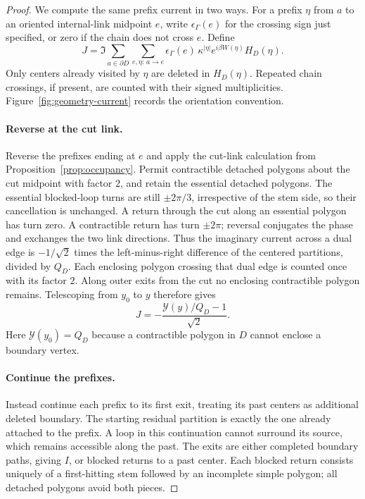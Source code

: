 \begin{proof}
We compute the same prefix current in two ways. For a prefix $\eta$ from $a$ to an oriented internal-link midpoint $e$, write $\epsilon_\Gamma(e)$ for the crossing sign just specified, or zero if the chain does not cross $e$. Define
\[
 J=\Im\sum_{a\in\partial D}\sum_{e,\eta:\,a\to e}
     \epsilon_\Gamma(e)\,
     \kappa^{|\eta|}e^{i\beta W(\eta)}H_D(\eta).
\]
Only centers already visited by $\eta$ are deleted in $H_D(\eta)$. Repeated chain crossings, if present, are counted with their signed multiplicities. Figure~\ref{fig:geometry-current} records the orientation convention.


\paragraph{Reverse at the cut link.}
Reverse the prefixes ending at $e$ and apply the cut-link calculation from Proposition~\ref{prop:occupancy}. Permit contractible detached polygons about the cut midpoint with factor $2$, and retain the essential detached polygons. The essential blocked-loop turns are still $\pm2\pi/3$, irrespective of the stem side, so their cancellation is unchanged. A return through the cut along an essential polygon has turn zero. A contractible return has turn $\pm2\pi$; reversal conjugates the phase and exchanges the two link directions. Thus the imaginary current across a dual edge is $-1/\sqrt2$ times the left-minus-right difference of the centered partitions, divided by $Q_D$. Each enclosing polygon crossing that dual edge is counted once with its factor $2$. Along outer exits from the cut no enclosing contractible polygon remains. Telescoping from $y_0$ to $y$ therefore gives
\begin{equation}\label{eq:prefix-current-potential}
 J=-\frac{\mathcal Y(y)/Q_D-1}{\sqrt2}.
\end{equation}
Here $\mathcal Y(y_0)=Q_D$ because a contractible polygon in $D$ cannot enclose a boundary vertex.

\paragraph{Continue the prefixes.}
Instead continue each prefix to its first exit, treating its past centers as additional deleted boundary. The starting residual partition is exactly the one already attached to the prefix. A loop in this continuation cannot surround its source, which remains accessible along the past. The exits are either completed boundary paths, giving $I$, or blocked returns to a past center. Each blocked return consists uniquely of a first-hitting stem followed by an incomplete simple polygon; all detached polygons avoid both pieces.


\end{proof}
